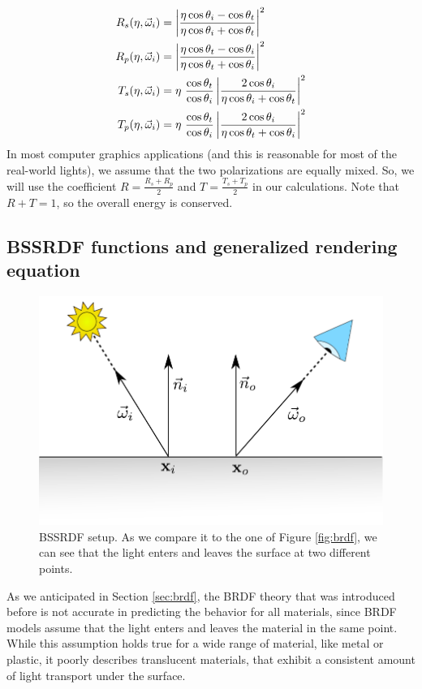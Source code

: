 \begin{equation*}
\begin{split}
R_s(\eta,\vec{\omega}_i) &= \left|\frac{\eta \cos\theta_i - \cos\theta_t} {\eta \cos\theta_i + \cos\theta_t}\right|^2 \\
R_p(\eta,\vec{\omega}_i) &= \left|\frac{\eta \cos\theta_t - \cos\theta_i} {\eta \cos\theta_t + \cos\theta_i}\right|^2\\
T_s(\eta,\vec{\omega}_i) &= \eta \ \frac{ \cos\theta_t}{ \cos\theta_i} \left|\frac{2 \cos\theta_i}{\eta \cos\theta_i + \cos\theta_t}\right|^2 \\
T_p(\eta,\vec{\omega}_i) &= \eta \ \frac{ \cos\theta_t}{ \cos\theta_i} \left|\frac{2 \cos\theta_i}{\eta \cos\theta_t + \cos\theta_i}\right|^2
\end{split}
\end{equation*}
In most computer graphics applications (and this is reasonable for most of the real-world lights), we assume that the two polarizations are equally mixed. So, we will use the coefficient $R = \frac{R_s + R_p}{2}$ and $T = \frac{T_s + T_p}{2}$ in our calculations. Note that $R + T = 1$, so the overall energy is conserved.

\subsection{BSSRDF functions and generalized rendering equation}
\begin{figure}
\centering
\includegraphics[width=0.8 \linewidth]{images/bssrdf} 
\caption{BSSRDF setup. As we compare it to the one of Figure \ref{fig:brdf}, we can see that the light enters and leaves the surface at two different points.}
\label{fig:bssrdf}
\end{figure}

As we anticipated in Section \ref{sec:brdf}, the BRDF theory that was introduced before is not accurate in predicting the behavior for all materials, since BRDF models assume that the light enters and leaves the material in the same point. While this assumption holds true for a wide range of material, like metal or plastic, it poorly describes translucent materials, that exhibit a consistent amount of light transport under the surface. 

